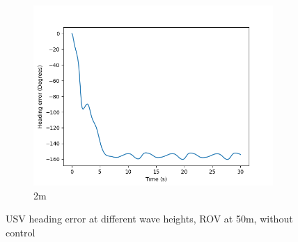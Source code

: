 \documentclass[class=article, crop=false]{standalone}
\begin{document}
\begin{figure}
\begin{subfigure}[b]{0.48\textwidth}
        \includegraphics{scenario1/rov-50m/2.0m/usv_heading_error_uncontrolled}
        \caption{2m}
        \label{}
    \end{subfigure}

    \caption{USV heading error at different wave heights, ROV at 50m, without control}
\end{figure}
\end{document}
